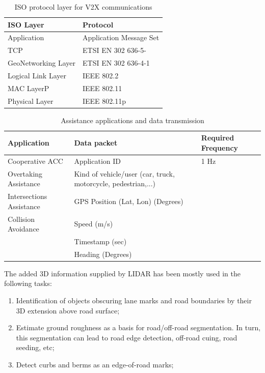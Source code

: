 \documentclass[12pt]{article}
\begin{document}
\begin{table}[h!]
    \begin{center}
        \caption{ISO protocol layer for V2X communications}
        \label{tab2}
          \begin{tabular}{|p{5cm}|p{5cm}|}
          \hline
           ISO Layer&Protocol\\
          \hline
          Application&Application Message Set\\
          \hline
          TCP&ETSI EN 302 636-5-\\
          \hline
          GeoNetworking Layer&ETSI EN 302 636-4-1\\
          \hline
          Logical Link Layer&IEEE 802.2\\
          \hline
          MAC LayerP&IEEE 802.11\\
          \hline
          Physical Layer&IEEE 802.11p\\
          \hline
          \end{tabular}
   \end{center}
\end{table}

\begin{table}[h!]
    \begin{center}
        \caption{Assistance applications and data transmission}
        \label{2}
          \begin{tabular}{|p{5cm}|p{5cm}|p{5cm}|}
          \hline
          Application&Data packet&Required Frequency\\
          \hline
          Cooperative ACC&Application ID&1 Hz\\
          \hline
          Overtaking Assistance&Kind of vehicle/user (car, truck, motorcycle, pedestrian,...)&\\
          \hline
          Intersections Assistance&GPS Position (Lat, Lon) (Degrees)&\\
          \hline
          Collision Avoidance&Speed (m/s)&\\
          \hline
          &Timestamp (sec)&\\
          \hline
          &Heading (Degrees)&\\
          \hline
          \end{tabular}
   \end{center}
\end{table}
\newpage
The added 3D information supplied by LIDAR has been mostly used in the following tasks:
\begin{enumerate}
\item Identification of objects obscuring lane marks and road boundaries by their 3D extension above road surface;
\item Estimate ground roughness as a basis for road/off-road segmentation. In turn, this segmentation can lead to road edge detection, off-road cuing, road seeding, etc;
\item Detect curbs and berms as an edge-of-road marks;
\end{enumerate}
\end{document}
